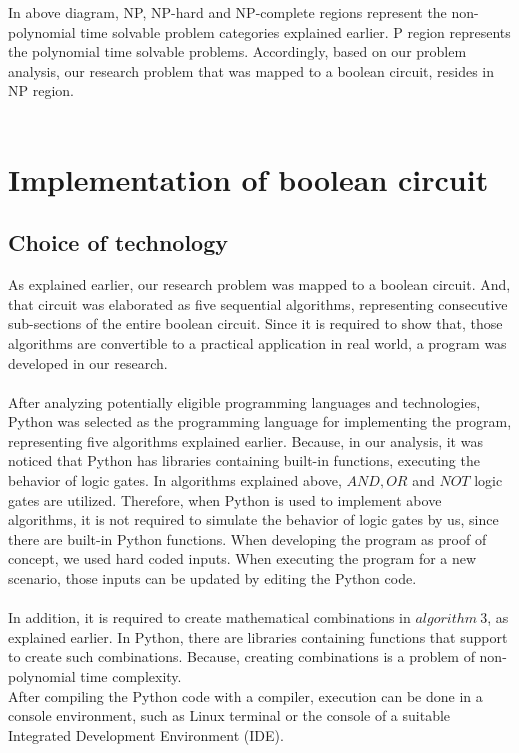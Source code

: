 In above diagram, NP, NP-hard and NP-complete regions represent the non-polynomial time solvable problem categories explained earlier. P region represents the polynomial time solvable problems. Accordingly, based on our problem analysis, our research problem that was mapped to a boolean circuit, resides in NP region.\\ \\

\section{Implementation of boolean circuit}
\subsection{Choice of technology}
As explained earlier, our research problem was mapped to a boolean circuit. And, that circuit was elaborated as five sequential algorithms, representing consecutive sub-sections of the entire boolean circuit. Since it is required to show that, those algorithms are convertible to a practical application in real world, a program was developed in our research.\\ \\
After analyzing potentially eligible programming languages and technologies, Python was selected as the programming language for implementing the program, representing five algorithms explained earlier. Because, in our analysis, it was noticed that Python has libraries containing built-in functions, executing the behavior of logic gates. In algorithms explained above, $AND, OR$ and $NOT$ logic gates are utilized. Therefore, when Python is used to implement above algorithms, it is not required to simulate the behavior of logic gates by us, since there are built-in Python functions. When developing the program as proof of concept, we used hard coded inputs. When executing the program for a new scenario, those inputs can be updated by editing the Python code.\\ \\
In addition, it is required to create mathematical combinations in $algorithm\ 3$, as explained earlier. In Python, there are libraries containing functions that support to create such combinations. Because, creating combinations is a problem of non-polynomial time complexity.\\
After compiling the Python code with a compiler, execution can be done in a console environment, such as Linux terminal or the console of a suitable Integrated Development Environment (IDE).\\

